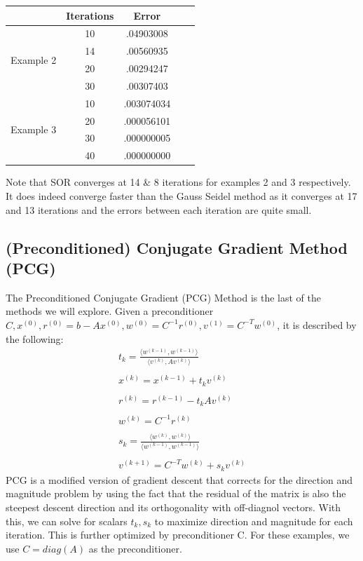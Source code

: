 \documentclass[11pt]{article}	%
\begin{document}
\begin{center}
	 \label{tab:title}
    \begin{tabular}{||c|c|c|c|c||}
        \hline
        & Iterations & Error \\ [.35em]
        \hline
        \multirow{4}{5em}{Example 2} & 10 & .04903008 \\ [.25em]
        & 14 & .00560935 \\ [.25em]
        & 20 & .00294247 \\ [.25em]
        & 30 & .00307403 \\ [.25em]
        \hline
        \multirow{4}{5em}{Example 3} & 10 & .003074034 \\ [.25em]
        & 20 & .000056101 \\ [.25em]
        & 30 & .000000005 \\ [.25em]
        & 40 & .000000000 \\ [.25em]
        \hline
    \end{tabular}
\end{center}

Note that SOR converges at 14 \& 8 iterations for examples 2 and 3 respectively. It does indeed converge faster than the Gauss Seidel method as it converges at 17 and 13 iterations and the errors between each iteration are quite small.

\subsection{(Preconditioned) Conjugate Gradient Method (PCG)}
The Preconditioned Conjugate Gradient (PCG) Method is the last of the methods we will explore. Given a preconditioner $C, x^{(0)}, r^{(0)} = b - Ax^{(0)}, w^{(0)} = C^{-1}r^{(0)}, v^{(1)} = C^{-T}w^{(0)}$, it is described by the following:
\begin{align*}\label{eq:precondition-conj-grad-eq-1}
    t_k = \frac{\langle w^{(k-1)}, w^{(k-1)}\rangle}{\langle v^{(k)}, Av^{(k)}\rangle} \\\\
    x^{(k)} = x^{(k-1)} + t_kv^{(k)} \\\\
    r^{(k)} = r^{(k-1)} - t_kAv^{(k)} \\\\
    w^{(k)} = C^{-1}r^{(k)} \\\\
    s_k = \frac{\langle w^{(k)}, w^{(k)}\rangle}{\langle w^{(k-1)}, w^{(k-1)}\rangle} \\\\
    v^{(k+1)} = C^{-T}w^{(k)} + s_kv^{(k)}
\end{align*}
PCG is a modified version of gradient descent that corrects for the direction and magnitude problem by using the fact that the residual of the matrix is also the steepest descent direction and its orthogonality with off-diagnol vectors. With this, we can solve for scalars $t_k, s_k$ to maximize direction and magnitude for each iteration. This is further optimized by preconditioner C. For these examples, we use $ C = diag(A) $ as the preconditioner.
\end{document}
